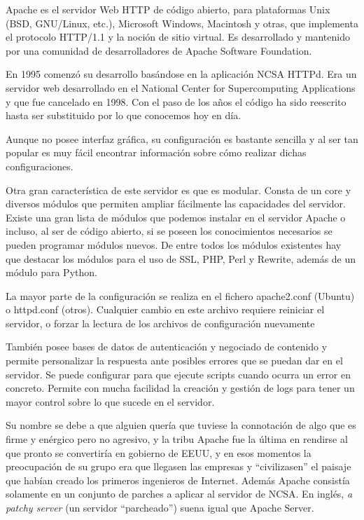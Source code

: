Apache es el servidor Web HTTP de código abierto, para plataformas Unix (BSD, GNU/Linux, etc.), Microsoft Windows, Macintosh y otras, que implementa el protocolo HTTP/1.1 y la noción de sitio virtual.  Es desarrollado y mantenido por una comunidad de desarrolladores de Apache Software Foundation.


En 1995 comenzó su desarrollo basándose en la aplicación NCSA HTTPd. Era un servidor web desarrollado en el National Center for Supercomputing Applications y que fue cancelado en 1998. Con el paso de los años el código ha sido reescrito hasta ser substituido por lo que conocemos hoy en día.


Aunque no posee interfaz gráfica, su configuración es bastante sencilla y al ser tan popular es muy fácil encontrar información sobre cómo realizar dichas configuraciones. 

Otra gran característica de este servidor es que es modular. Consta de un core y diversos módulos que permiten ampliar fácilmente las capacidades del servidor. Existe una gran lista de módulos que podemos instalar en el servidor Apache o incluso, al ser de código abierto, si se poseen los conocimientos necesarios se pueden programar módulos nuevos. De entre todos los módulos existentes hay que destacar los módulos para el uso de SSL, PHP, Perl y Rewrite, además de un módulo para Python. 

La mayor parte de la configuración se realiza en el fichero apache2.conf (Ubuntu) o httpd.conf (otros). Cualquier cambio en este archivo requiere reiniciar el servidor, o forzar la lectura de los archivos de configuración nuevamente

También posee bases de datos de autenticación y negociado de contenido y permite personalizar la respuesta ante posibles errores que se puedan dar en el servidor. Se puede configurar para que ejecute scripts cuando ocurra un error en concreto. Permite con mucha facilidad la creación y gestión de logs para tener un mayor control sobre lo que sucede en el servidor.


Su nombre se debe a que alguien quería que tuviese la connotación de algo que es firme y enérgico pero no agresivo, y la tribu Apache fue la última en rendirse al que pronto se convertiría en gobierno de EEUU, y en esos momentos la preocupación de su grupo era que llegasen las empresas y ``civilizasen'' el paisaje que habían creado los primeros ingenieros de Internet. Además Apache consistía solamente en un conjunto de parches a aplicar al servidor de NCSA. En inglés, \textit{a patchy server} (un servidor ``parcheado'') suena igual que Apache Server.


